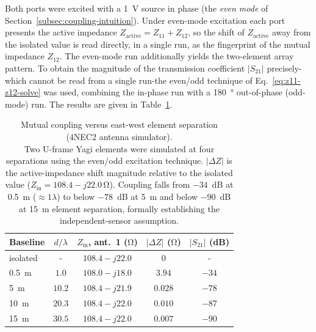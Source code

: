 Both ports were excited with a \SI{1}{\volt} source in phase (the
\emph{even mode} of Section~\ref{subsec:coupling-intuition}). Under even-mode
excitation each port presents the active impedance
$Z_\mathrm{active}=Z_{11}+Z_{12}$, so the shift of $Z_\mathrm{active}$ away
from the isolated value is read directly, in a single run, as the fingerprint
of the mutual impedance $Z_{12}$. The even-mode run additionally yields the
two-element array pattern. To obtain the magnitude of the transmission
coefficient $|S_{21}|$ precisely-which cannot be read from a single run-the
even/odd technique of Eq.~\eqref{eq:z11-z12-solve} was used, combining the
in-phase run with a \SI{180}{\degree} out-of-phase (odd-mode) run. The results
are given in Table~\ref{tab:coupling}.

\begin{table}[H]
  \centering
  \caption[Mutual coupling versus east-west element separation (4NEC2)]{Mutual coupling versus east-west element separation (4NEC2 antenna simulator).\\[4pt]
           Two U-frame Yagi elements were simulated at four separations using
           the even/odd excitation technique. $|\Delta Z|$ is the
           active-impedance shift magnitude relative to the isolated value
           ($Z_\mathrm{in}=108.4-j22.0\,\si{\ohm}$). Coupling falls from
           $-34$~dB at 0.5~m ($\approx1\lambda$) to below $-78$~dB at 5~m
           and below $-90$~dB at 15~m element separation, formally
           establishing the independent-sensor assumption.}
  \label{tab:coupling}
  \renewcommand{\arraystretch}{1.3}
  \begin{tabular}{l c c c c}
    \toprule
    \textbf{Baseline} & \textbf{$d/\lambda$} &
    \textbf{$Z_\mathrm{in}$, ant.~1 ($\si{\ohm}$)} &
    \textbf{$|\Delta Z|$ ($\si{\ohm}$)} & \textbf{$|S_{21}|$ (dB)} \\
    \midrule
    isolated        & -   & $108.4 - j22.0$ & $0$     & -  \\
    \SI{0.5}{\metre} & $1.0$  & $108.0 - j18.0$ & $3.94$  & $-34$ \\
    \SI{5}{\metre}   & $10.2$ & $108.4 - j21.9$ & $0.028$ & $-78$ \\
    \SI{10}{\metre}  & $20.3$ & $108.4 - j22.0$ & $0.010$ & $-87$ \\
    \SI{15}{\metre}  & $30.5$ & $108.4 - j22.0$ & $0.007$ & $-90$ \\
    \bottomrule
  \end{tabular}
\end{table}


